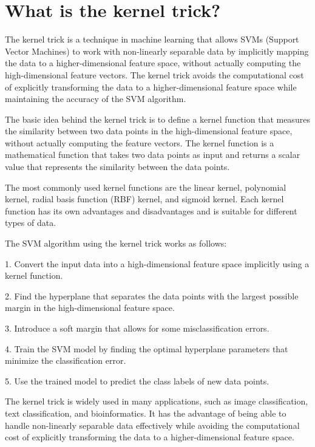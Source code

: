 \section{What is the kernel trick?}
The kernel trick is a technique in machine learning that allows SVMs (Support Vector Machines) to work with non-linearly separable data by implicitly mapping the data to a higher-dimensional feature space, without actually computing the high-dimensional feature vectors. The kernel trick avoids the computational cost of explicitly transforming the data to a higher-dimensional feature space while maintaining the accuracy of the SVM algorithm.

The basic idea behind the kernel trick is to define a kernel function that measures the similarity between two data points in the high-dimensional feature space, without actually computing the feature vectors. The kernel function is a mathematical function that takes two data points as input and returns a scalar value that represents the similarity between the data points.

The most commonly used kernel functions are the linear kernel, polynomial kernel, radial basis function (RBF) kernel, and sigmoid kernel. Each kernel function has its own advantages and disadvantages and is suitable for different types of data.

The SVM algorithm using the kernel trick works as follows:

1. Convert the input data into a high-dimensional feature space implicitly using a kernel function.

2. Find the hyperplane that separates the data points with the largest possible margin in the high-dimensional feature space.

3. Introduce a soft margin that allows for some misclassification errors.

4. Train the SVM model by finding the optimal hyperplane parameters that minimize the classification error.

5. Use the trained model to predict the class labels of new data points.

The kernel trick is widely used in many applications, such as image classification, text classification, and bioinformatics. It has the advantage of being able to handle non-linearly separable data effectively while avoiding the computational cost of explicitly transforming the data to a higher-dimensional feature space.

